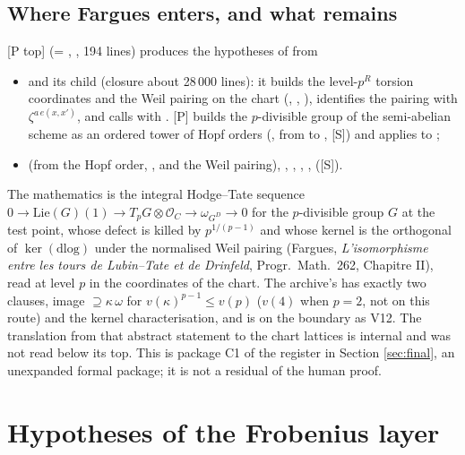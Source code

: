 \documentclass[11pt]{article}
\newcommand{\mP}{\textsf{[P]}}
\newcommand{\mPt}{\textsf{[P top]}}
\newcommand{\mS}{\textsf{[S]}}
\newcommand{\cO}{\mathcal O}
\theoremstyle{remark}
\begin{document}
\subsection{Where Fargues enters, and what remains}
\mPt{}  (= , , 194 lines) produces the hypotheses of  from
\begin{itemize}[nosep]
\item {} and its child  (closure about 28\,000 lines): it builds the level-$p^R$ torsion coordinates and the Weil pairing on the chart (, , ), identifies the pairing with $\zeta^{a\,e(x,x')}$, and calls  with . \mP{}  builds the $p$-divisible group of the semi-abelian scheme as an ordered tower of Hopf orders (, from  to , \mS) and applies  to ;
\item {} (from the Hopf order, , and the Weil pairing), , , , ,  (\mS).
\end{itemize}
The mathematics is the integral Hodge--Tate sequence $0\to\mathrm{Lie}(G)(1)\to T_pG\otimes\cO_C\to\omega_{G^D}\to0$ for the $p$-divisible group $G$ at the test point, whose defect is killed by $p^{1/(p-1)}$ and whose kernel is the orthogonal of $\ker(\mathrm{dlog})$ under the normalised Weil pairing (Fargues, \emph{L'isomorphisme entre les tours de Lubin--Tate et de Drinfeld}, Progr.\ Math.\ 262, Chapitre II), read at level $p$ in the coordinates of the chart. The archive's  has exactly two clauses, image $\supseteq\kappa\,\omega$ for $v(\kappa)^{p-1}\le v(p)$ ($v(4)$ when $p=2$, not on this route) and the kernel characterisation, and is on the boundary as V12. The translation from that abstract statement to the chart lattices is internal and was not read below its top. This is package C1 of the register in Section \ref{sec:final}, an unexpanded formal package; it is not a residual of the human proof.

\section{Hypotheses of the Frobenius layer}\label{sec:hyp}
\end{document}
